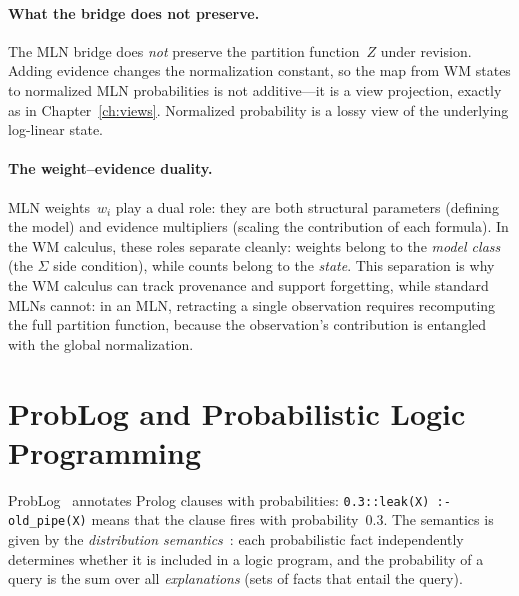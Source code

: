 \paragraph{What the bridge does not preserve.}
The MLN bridge does \emph{not} preserve the partition function~$Z$
under revision.  Adding evidence changes the normalization constant,
so the map from WM states to normalized MLN probabilities is not
additive---it is a view projection, exactly as in
Chapter~\ref{ch:views}.  Normalized probability is a lossy view of
the underlying log-linear state.

\paragraph{The weight--evidence duality.}
MLN weights~$w_i$ play a dual role: they are both structural parameters
(defining the model) and evidence multipliers (scaling the contribution
of each formula).  In the WM calculus, these roles separate cleanly:
weights belong to the \emph{model class} (the $\Sigma$ side condition),
while counts belong to the \emph{state}.  This separation is why the
WM calculus can track provenance and support forgetting, while standard
MLNs cannot: in an MLN, retracting a single observation requires
recomputing the full partition function, because the observation's
contribution is entangled with the global normalization.



\section{ProbLog and Probabilistic Logic Programming}
\label{sec:bridge-problog}

ProbLog~\cite{DeRaedt2007ProbLog} annotates Prolog clauses with
probabilities: \texttt{0.3::leak(X) :- old\_pipe(X)} means that the
clause fires with probability~$0.3$.  The semantics is given by the
\emph{distribution semantics}~\cite{Sato1995}: each probabilistic fact
independently determines whether it is included in a logic program, and
the probability of a query is the sum over all \emph{explanations}
(sets of facts that entail the query).


